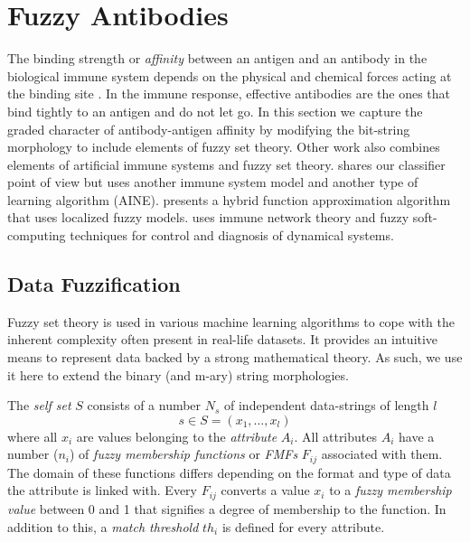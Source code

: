 \documentclass{llncs}
\begin{document}
\section{Fuzzy Antibodies}
\label{sec_fuzzy}
The binding strength or {\it affinity} between an antigen and an antibody in the biological immune system depends on the physical and chemical forces acting at the binding site \cite{parham}.
In the immune response, effective antibodies are the ones that bind tightly to an antigen and do not let go.
In this section we capture the graded character of antibody-antigen affinity by modifying the bit-string morphology to include elements of fuzzy set theory.
Other work also combines elements of artificial immune systems and fuzzy set theory.
\cite{fuzzy} shares our classifier point of view but uses another immune system model and another type of learning algorithm (AINE).
\cite{diao} presents a hybrid function approximation algorithm that uses localized fuzzy models.
\cite{sasaki} uses immune network theory and fuzzy soft-computing techniques for control and diagnosis of dynamical systems. 

\subsection{Data Fuzzification}
\label{ssec_fuzzyfication}
Fuzzy set theory is used in various machine learning algorithms to cope with the inherent complexity often present in real-life datasets.
It provides an intuitive means to represent data backed by a strong mathematical theory.
As such, we use it here to extend the binary (and m-ary) string morphologies.

The {\it self set} $S$ consists of a number $N_s$ of independent data-strings of length $l$
$$
  s \in S = (x_1,\ldots,x_l)
$$
where all $x_i$ are values belonging to the {\it attribute} $A_i$.
All attributes $A_i$ have a number ($n_i$) of {\it fuzzy membership functions} or {\it FMFs} $F_{ij}$ associated with them.
The domain of these functions differs depending on the format and type of data the attribute is linked with.
Every $F_{ij}$ converts a value $x_i$ to a {\it fuzzy membership value} between 0 and 1 that signifies a degree of membership to the function.
In addition to this, a {\it match threshold} $th_i$ is defined for every attribute.
\end{document}
